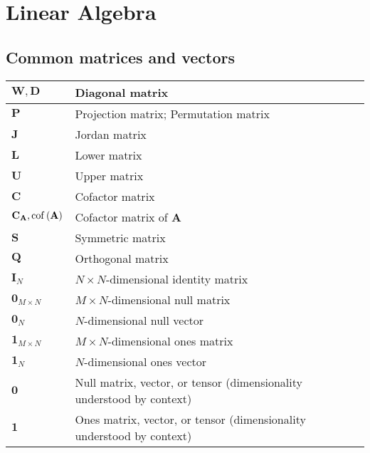 \documentclass{article}
\begin{document}
\section{Linear Algebra}
\subsection{Common matrices and vectors}
\begin{xltabular}{\textwidth}{XX}
    \(\mathbf{W}, \mathbf{D}\)                    & Diagonal matrix \\ \hline
    \(\mathbf{P}\)                                & Projection matrix; Permutation matrix \\ \hline
    \(\mathbf{J}\)                                & Jordan matrix \\ \hline
    \(\mathbf{L}\)                                & Lower matrix\\ \hline
    \(\mathbf{U}\)                                & Upper matrix\\ \hline
    \(\mathbf{C}\)                                & Cofactor matrix\\ \hline
    \(\mathbf{C}_\mathbf{A}, \operatorname{cof}\left(\mathbf{A}\right)\)   & Cofactor matrix of \(\mathbf{A}\)\\ \hline
    \(\mathbf{S}\)                                & Symmetric matrix\\ \hline
    \(\mathbf{Q}\)                                & Orthogonal matrix\\ \hline
    \(\mathbf{I}_N\)                              & \(N\times N\)-dimensional identity matrix\\ \hline
    \(\mathbf{0}_{M\times N}\)                    & \(M\times N\)-dimensional null matrix\\ \hline
    \(\mathbf{0}_{N}\)                            & \(N\)-dimensional null vector\\ \hline
    \(\mathbf{1}_{M\times N}\)                    & \(M\times N\)-dimensional ones matrix\\ \hline
    \(\mathbf{1}_{N}\)                            & \(N\)-dimensional ones vector\\ \hline
    \(\mathbf{0}\)                                & Null matrix, vector, or tensor (dimensionality understood by context)\\ \hline
    \(\mathbf{1}\)                                & Ones matrix, vector, or tensor (dimensionality understood by context)\\
\end{xltabular}
\end{document}
